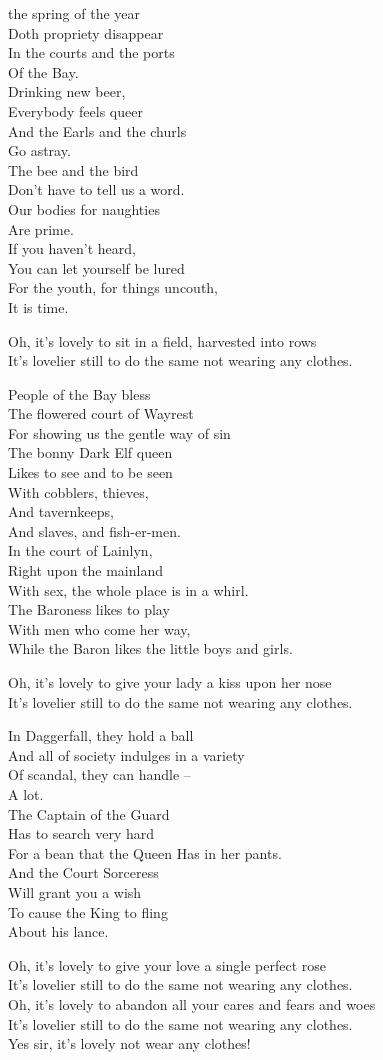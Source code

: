 
 the spring of the year\\Doth propriety disappear\\In the courts and the ports\\Of the Bay.\\Drinking new beer,\\Everybody feels queer\\And the Earls and the churls\\Go astray.\\The bee and the bird\\Don't have to tell us a word.\\Our bodies for naughties\\Are prime.\\If you haven't heard,\\You can let yourself be lured\\For the youth, for things uncouth,\\It is time.

Oh, it's lovely to sit in a field, harvested into rows\\It's lovelier still to do the same not wearing any clothes.

People of the Bay bless\\The flowered court of Wayrest\\For showing us the gentle way of sin\\The bonny Dark Elf queen\\Likes to see and to be seen\\With cobblers, thieves,\\And tavernkeeps,\\And slaves, and fish-er-men.\\In the court of Lainlyn,\\Right upon the mainland\\With sex, the whole place is in a whirl.\\The Baroness likes to play\\With men who come her way,\\While the Baron likes the little boys and girls.

Oh, it's lovely to give your lady a kiss upon her nose\\It's lovelier still to do the same not wearing any clothes.

In Daggerfall, they hold a ball\\And all of society indulges in a variety\\Of scandal, they can handle --\\A lot.\\The Captain of the Guard\\Has to search very hard\\For a bean that the Queen Has in her pants.\\And the Court Sorceress\\Will grant you a wish\\To cause the King to fling\\About his lance.

Oh, it's lovely to give your love a single perfect rose\\It's lovelier still to do the same not wearing any clothes.\\Oh, it's lovely to abandon all your cares and fears and woes\\It's lovelier still to do the same not wearing any clothes.\\Yes sir, it's lovely not wear any clothes!